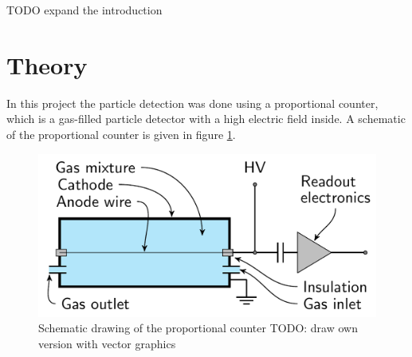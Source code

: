 \documentclass[a4paper]{article}
\begin{document}
TODO expand the introduction


\section{Theory}
\label{theory}


In this project the particle detection was done using a proportional counter, which is a gas-filled particle detector with a high electric field inside.
\cite{instructions}
A schematic of the proportional counter is given in figure \ref{fig:theory_schematic}.

\begin{figure}[ht!]
\centering
\includegraphics[width=\textwidth]{fig/article/schematic.png}
\caption{Schematic drawing of the proportional counter \cite{winkler_gaseous_2015} TODO: draw own version with vector graphics}
\label{fig:theory_schematic}
\end{figure}
\end{document}
